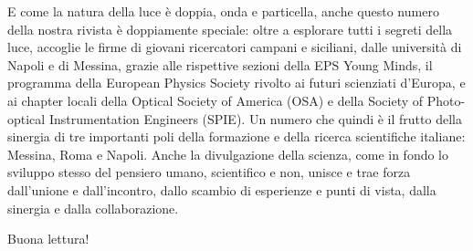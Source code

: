 \smallskip
E come la natura della luce è doppia, onda e particella, anche questo numero della nostra rivista è doppiamente speciale: oltre a esplorare tutti i segreti della luce, accoglie le firme di giovani ricercatori campani e siciliani,
dalle università di Napoli e di Messina, grazie alle rispettive sezioni della EPS Young Minds, il programma della European Physics Society rivolto ai futuri scienziati d'Europa,
e ai chapter locali della Optical Society of America (OSA) e della Society of Photo-optical Instrumentation Engineers (SPIE).
Un numero che quindi è il frutto della sinergia di tre importanti poli della formazione e della ricerca scientifiche italiane: Messina, Roma e Napoli. Anche la divulgazione della scienza,
come in fondo lo sviluppo stesso del pensiero umano, scientifico e non, unisce e trae forza dall'unione e dall'incontro, dallo scambio di esperienze e punti di vista, dalla sinergia e dalla collaborazione.

\medskip
Buona lettura!

\begin{flushright}
\label{fig:light}
\end{flushright}

